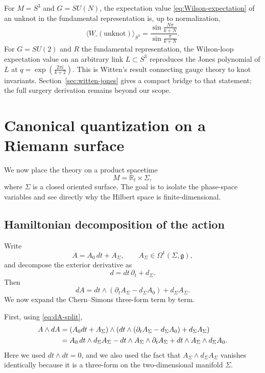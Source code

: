 \documentclass[11pt]{article}
\newcommand{\R}{\mathbb{R}}
\theoremstyle{definition}
\numberwithin{theorem}{section}
\numberwithin{equation}{section}
\let\del\partial
\begin{document}
\noindent For $M = S^3$ and $G = SU(N)$, the expectation value \eqref{eq:Wilson-expectation} of an unknot in the fundamental representation is, up to normalization,
\begin{equation*}
\langle W_{\square}(\text{unknot})\rangle_{S^3} = \frac{\sin\frac{N\pi}{k+N}}{\sin\frac{\pi}{k+N}}.
\end{equation*}
For $G=SU(2)$ and $R$ the fundamental representation, the Wilson-loop expectation value on an arbitrary link $L\subset S^3$ reproduces the Jones polynomial of $L$ at $q = \exp\left(\frac{2\pi i}{k+2}\right)$. This is Witten's result \cite{Witten1989Jones} connecting gauge theory to knot invariants. Section~\ref{sec:witten-jones} gives a compact bridge to that statement; the full surgery derivation remains beyond our scope.

\section{Canonical quantization on a Riemann surface}\label{sec:hilbert}

We now place the theory on a product spacetime
\begin{equation*}
M = \R_t\times \Sigma,
\end{equation*}
where $\Sigma$ is a closed oriented surface. The goal is to isolate the phase-space variables and see directly why the Hilbert space is finite-dimensional.

\subsection{Hamiltonian decomposition of the action}

Write
\begin{equation*}
A = A_0\,dt + A_\Sigma,
\qquad
A_\Sigma \in \Omega^1(\Sigma,\mathfrak{g}),
\end{equation*}
and decompose the exterior derivative as
\begin{equation*}
d = dt\,\del_t + d_\Sigma.
\end{equation*}
Then
\begin{equation}\label{eq:dA-split}
dA = dt\wedge(\del_t A_\Sigma - d_\Sigma A_0) + d_\Sigma A_\Sigma.
\end{equation}
We now expand the Chern--Simons three-form term by term.

\medskip

\noindent First, using \eqref{eq:dA-split},
\begin{align}
A\wedge dA
&=
(A_0dt + A_\Sigma)\wedge\left(dt\wedge(\del_t A_\Sigma - d_\Sigma A_0) + d_\Sigma A_\Sigma\right) \notag\\
&=
A_0\,dt\wedge d_\Sigma A_\Sigma
- dt\wedge A_\Sigma\wedge \del_t A_\Sigma
+ dt\wedge A_\Sigma\wedge d_\Sigma A_0.
\label{eq:A-dA-split}
\end{align}
Here we used $dt\wedge dt = 0$, and we also used the fact that $A_\Sigma\wedge d_\Sigma A_\Sigma$ vanishes identically because it is a three-form on the two-dimensional manifold $\Sigma$.
\end{document}
